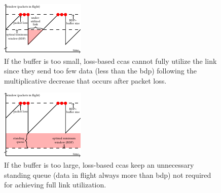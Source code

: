 \documentclass[conference]{IEEEtran}
\begin{document}
\begin{figure}[h]
\includegraphics[width=\columnwidth]{figures/cocoa_illustration_too_little.pdf}
\caption{If the buffer is too small, loss-based \glspl{cca} cannot fully utilize the link since they send too few data (less than the \gls{bdp}) following the multiplicative decrease that occurs after packet loss.}
\label{fig:tooLittle}
\end{figure}
\begin{figure}[h]
\includegraphics[width=\columnwidth]{figures/cocoa_illustration_too_much.pdf}
\caption{If the buffer is too large, loss-based \glspl{cca} keep an unnecessary standing queue (data in flight always more than \gls{bdp}) not required for achieving full link utilization.}
\label{fig:tooMuch}
\end{figure}
\end{document}
